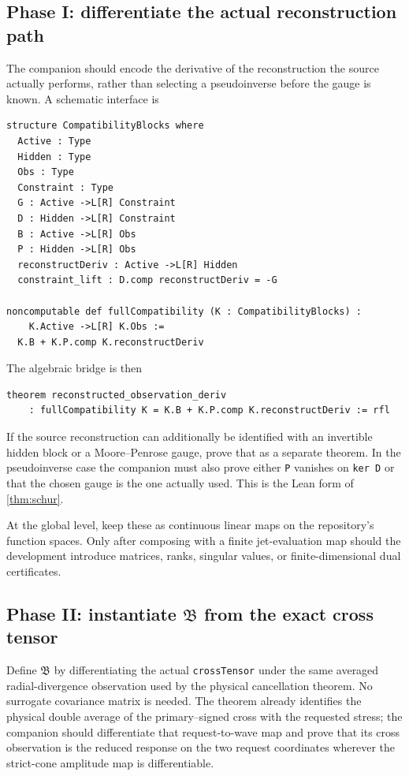 \documentclass[12pt]{article}
\theoremstyle{plain}
\theoremstyle{definition}
\theoremstyle{remark}
\newcommand{\Red}{\mathfrak B}
\begin{document}
\subsection{Phase I: differentiate the actual reconstruction path}
The companion should encode the derivative of the reconstruction the source actually performs, rather than selecting a pseudoinverse before the gauge is known. A schematic interface is
\begin{lstlisting}
structure CompatibilityBlocks where
  Active : Type
  Hidden : Type
  Obs : Type
  Constraint : Type
  G : Active ->L[R] Constraint
  D : Hidden ->L[R] Constraint
  B : Active ->L[R] Obs
  P : Hidden ->L[R] Obs
  reconstructDeriv : Active ->L[R] Hidden
  constraint_lift : D.comp reconstructDeriv = -G

noncomputable def fullCompatibility (K : CompatibilityBlocks) :
    K.Active ->L[R] K.Obs :=
  K.B + K.P.comp K.reconstructDeriv
\end{lstlisting}
The algebraic bridge is then
\begin{lstlisting}
theorem reconstructed_observation_deriv
    : fullCompatibility K = K.B + K.P.comp K.reconstructDeriv := rfl
\end{lstlisting}
If the source reconstruction can additionally be identified with an invertible hidden block or a Moore--Penrose gauge, prove that as a separate theorem. In the pseudoinverse case the companion must also prove either \texttt{P} vanishes on \texttt{ker D} or that the chosen gauge is the one actually used. This is the Lean form of \cref{thm:schur}.

At the global level, keep these as continuous linear maps on the repository's function spaces. Only after composing with a finite jet-evaluation map should the development introduce matrices, ranks, singular values, or finite-dimensional dual certificates.

\subsection{Phase II: instantiate \texorpdfstring{\(\Red\)}{the reduced operator} from the exact cross tensor}
Define \(\Red\) by differentiating the actual \texttt{crossTensor} under the same averaged radial-divergence observation used by the physical cancellation theorem. No surrogate covariance matrix is needed. The theorem  already identifies the physical double average of the primary--signed cross with the requested stress; the companion should differentiate that request-to-wave map and prove that its cross observation is the reduced response on the two request coordinates wherever the strict-cone amplitude map is differentiable.
\end{document}
